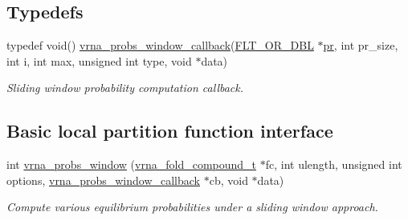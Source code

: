 \subsection*{Typedefs}
\begin{DoxyCompactItemize}
\item 
typedef void() \mbox{\hyperlink{group__part__func__window_gabe710a1182e6db69cc75329dfc9bed67}{vrna\+\_\+probs\+\_\+window\+\_\+callback}}(\mbox{\hyperlink{group__data__structures_ga31125aeace516926bf7f251f759b6126}{F\+L\+T\+\_\+\+O\+R\+\_\+\+D\+BL}} $\ast$\mbox{\hyperlink{fold__vars_8h_ac98ec419070aee6831b44e5c700f090f}{pr}}, int pr\+\_\+size, int i, int max, unsigned int type, void $\ast$data)
\begin{DoxyCompactList}\small\item\em Sliding window probability computation callback. \end{DoxyCompactList}\end{DoxyCompactItemize}
\subsection*{Basic local partition function interface}
\begin{DoxyCompactItemize}
\item 
int \mbox{\hyperlink{group__part__func__window_ga7115d012988541a65ec323c5f17a334b}{vrna\+\_\+probs\+\_\+window}} (\mbox{\hyperlink{group__fold__compound_ga1b0cef17fd40466cef5968eaeeff6166}{vrna\+\_\+fold\+\_\+compound\+\_\+t}} $\ast$fc, int ulength, unsigned int options, \mbox{\hyperlink{group__part__func__window_gabe710a1182e6db69cc75329dfc9bed67}{vrna\+\_\+probs\+\_\+window\+\_\+callback}} $\ast$cb, void $\ast$data)
\begin{DoxyCompactList}\small\item\em Compute various equilibrium probabilities under a sliding window approach. \end{DoxyCompactList}\end{DoxyCompactItemize}
